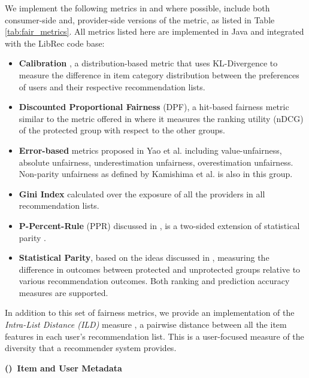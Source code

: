 We implement the following metrics in \libauto{} and where possible, include both consumer-side and, provider-side versions of the metric, as listed in Table \ref{tab:fair_metrics}. All metrics listed here are implemented in Java and integrated with the LibRec code base: 

\begin{itemize}
    \item \textbf{Calibration} \cite{steck2018calibrated}, a distribution-based metric that uses KL-Divergence to measure the difference in item category distribution between the preferences of users and their respective recommendation lists.
    \item \textbf{Discounted Proportional Fairness} (DPF), a hit-based fairness metric similar to the metric offered in \cite{castillo2019fairness} where it measures the ranking utility (nDCG) of the protected group with respect to the other groups. 
    \item \textbf{Error-based} metrics proposed in Yao et al. \cite{yao2017beyond} including value-unfairness, absolute unfairness, underestimation unfairness, overestimation unfairness. Non-parity unfairness as defined by Kamishima et al. \cite{kamishima2011fairness} is also in this group.
    \item \textbf{Gini Index} calculated over the exposure of all the providers in all recommendation lists. 
    \item \textbf{P-Percent-Rule} (PPR) discussed in \cite{biddle2006adverse}, is a two-sided extension of statistical parity \cite{barocas2016big}. 
    \item \textbf{Statistical Parity}, based on the ideas discussed in \cite{zemel2013learning,ritov2017conditional}, measuring the difference in outcomes between protected and unprotected groups relative to various recommendation outcomes. Both ranking and prediction accuracy measures are supported.
\end{itemize}

In addition to this set of fairness metrics, we provide an implementation of the \textit{Intra-List Distance (ILD)} measure \cite{ziegler2005improving}, a pairwise distance between all the item features in each user’s recommendation list. This is a user-focused measure of the diversity that a recommender system provides. 

\vspace{0.25cm}
\noindent \textbf{()~Item and User Metadata}
\vspace{0.25cm}

